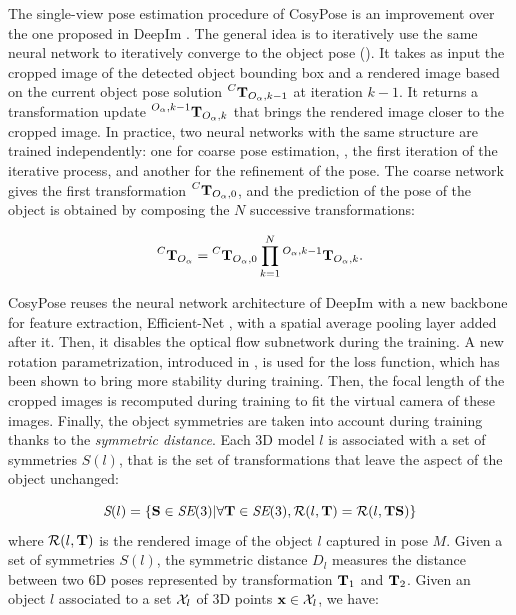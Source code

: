 The single-view pose estimation procedure of CosyPose is an improvement over the one proposed in DeepIm \cite{deepim_2019}. The general idea is to iteratively 
use the same neural network to iteratively converge to the object pose (). It takes as input the cropped image  of the detected 
object bounding box and a rendered image based on the current object pose solution $\prescript{C}{}{{\bf T}}_{O_{\alpha},k-1}$ at iteration $k-1$. 
It returns a transformation update $\prescript{O_{\alpha},k-1}{}{{\bf T}}_{O_{\alpha},k}$ that brings the rendered image closer to the cropped image. In practice, 
two neural networks with the same structure are trained independently: one for coarse pose estimation, \ie, the first iteration of the iterative process, 
and another for the refinement of the pose. The coarse network gives the first transformation $\prescript{C}{}{{\bf T}}_{O_{\alpha},0}$, 
and the prediction of the pose of the object is obtained by composing the $N$ successive transformations:

\begin{equation}
\prescript{C}{}{{\bf T}}_{O_{\alpha}} = \prescript{C}{}{{\bf T}}_{O_{\alpha},0} \prod_{k=1}^N  \prescript{O_{\alpha},k-1}{}{{\bf T}}_{O_{\alpha},k}.
\end{equation}

CosyPose reuses the neural network architecture of DeepIm with a new backbone for feature extraction, Efficient-Net \cite{tan2020efficientnet} ,
with a spatial average pooling layer added after it. Then, it disables the optical flow subnetwork during the training. 
A new rotation parametrization, introduced in \cite{zhou2020continuity}, is used for the loss function, which has been shown 
to bring more stability during training. Then, the focal length of the cropped images is recomputed during training to fit the virtual camera 
of these images. Finally, the object symmetries are taken into account during training thanks to the \textit{symmetric distance}. 
Each 3D model $l$ is associated with a set of symmetries $S(l)$, that is the set of transformations that leave the aspect of the object unchanged:

\begin{equation}
    \textit{S}(l) = \left \{ {\bf S} \in \textit{SE}(3) | \forall {\bf T} \in \textit{SE}(3), \mathcal{R}(l,{\bf T}) = \mathcal{R}(l,{\bf T} {\bf S})\right \}
\end{equation}
%
where $\mathcal{R}(l,{\bf T})$ is the rendered image of the object $l$ captured in pose $M$. Given a set of symmetries $S(l)$, 
the symmetric distance $D_l$ measures the distance between two 6D poses represented by transformation ${\bf T}_1$ and ${\bf T}_2$. 
Given an object $l$ associated to a set $\mathcal{X}_l$ of 3D points $\mathbf{x} \in \mathcal{X}_l$, we have:

